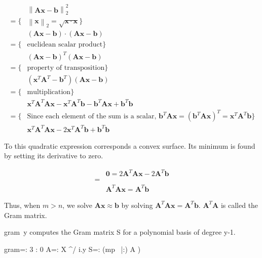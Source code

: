 \documentclass[10pt]{article}%
\renewcommand{\vec}[1]{\boldsymbol{#1}}
\newcommand{\norm}[1]{\left\lVert#1\right\rVert}
\begin{document}
\begin{align*}
 & \norm{\vec{A}\vec{x}-\vec{b}}^2_2 \\
= \{ & \norm{\vec{x}}_2 = \sqrt{\vec{x}\cdot\vec{x}} \} \\
 & \left(\vec{A}\vec{x}-\vec{b}\right) \cdot \left(\vec{A}\vec{x}-\vec{b}\right) \\
= \{ & \text{euclidean scalar product} \} \\
 & \left(\vec{A}\vec{x}-\vec{b}\right)^T \left(\vec{A}\vec{x}-\vec{b}\right) \\
= \{ & \text{property of transposition} \} \\
 & \left(\vec{x}^T\vec{A}^T - \vec{b}^T \right) \left(\vec{A}\vec{x}-\vec{b}\right) \\
= \{ & \text{multiplication} \} \\
 & \vec{x}^T\vec{A}^T\vec{A}\vec{x} - \vec{x}^T\vec{A}^T\vec{b} - \vec{b}^T\vec{A}\vec{x} + \vec{b}^T\vec{b} \\
= \{ & \text{Since each element of the sum is a scalar, } \vec{b}^T\vec{A}\vec{x} = \left(\vec{b}^T\vec{A}\vec{x}\right)^T = \vec{x}^T\vec{A}^T\vec{b} \} \\
 & \vec{x}^T\vec{A}^T\vec{A}\vec{x} - 2\vec{x}^T\vec{A}^T\vec{b} + \vec{b}^T\vec{b}
\end{align*}

To this quadratic expression corresponds a convex surface.
Its minimum is found by setting its derivative to zero.

\begin{align*}
 & \vec{0} = 2\vec{A}^T\vec{A}\vec{x} - 2\vec{A}^T\vec{b} \\
=& \\
 & \vec{A}^T\vec{A}\vec{x} = \vec{A}^T\vec{b}
\end{align*}

Thus, when $m>n$, we solve $\vec{A}\vec{x}\approx\vec{b}$ by solving
$\vec{A}^T\vec{A}\vec{x} = \vec{A}^T\vec{b}$.
$\vec{A}^T\vec{A}$ is called the Gram matrix.

{\Tt{}gram\ y\nwendquote} computes the Gram matrix {\Tt{}S\nwendquote} for a polynomial basis of degree {\Tt{}y-1\nwendquote}.

\nwenddocs{}\endmoddef\nwstartdeflinemarkup{}\nwenddeflinemarkup
gram=: 3 : 0
  A=: X ^/ i.y
  S=: (mp~ |:) A
) 
\end{document}
